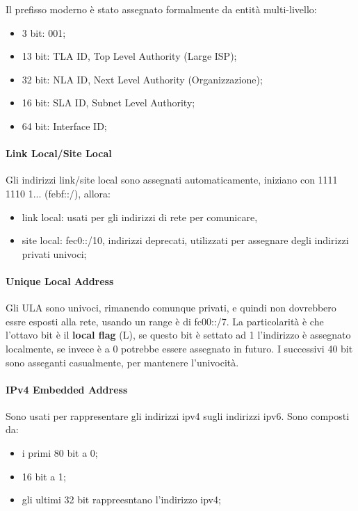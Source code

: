\documentclass[12pt]{article}
\begin{document}
Il prefisso moderno \`e stato assegnato formalmente da entit\`a multi-livello:
\begin{itemize}
    \item 3 bit: 001;
    \item 13 bit: TLA ID, Top Level Authority (Large ISP);
    \item 32 bit: NLA ID, Next Level Authority (Organizzazione);
    \item 16 bit: SLA ID, Subnet Level Authority;
    \item 64 bit: Interface ID;
\end{itemize}


\paragraph{Link Local/Site Local}
Gli indirizzi link/site local sono assegnati automaticamente, iniziano con 1111 1110 1... (febf::/), allora:
\begin{itemize}
    \item link local: usati per gli indirizzi di rete per comunicare,
    \item site local: fec0::/10, indirizzi deprecati, utilizzati per assegnare degli indirizzi privati univoci;
\end{itemize}


\paragraph{Unique Local Address}
Gli ULA sono univoci, rimanendo comunque privati, e quindi non dovrebbero essre esposti alla rete, usando un range \`e di fc00::/7. La particolarit\`a \`e che l'ottavo bit \`e il \textbf{local flag} (L), se questo bit \`e settato ad 1 l'indirizzo \`e assegnato localmente, se invece \`e a 0 potrebbe essere assegnato in futuro. I successivi 40 bit sono asseganti casualmente, per mantenere l'univocit\`a.

\paragraph{IPv4 Embedded Address}
Sono usati per rappresentare gli indirizzi ipv4 sugli indirizzi ipv6. Sono composti da:
\begin{itemize}
    \item i primi 80 bit a 0;
    \item 16 bit a 1;
    \item gli ultimi 32 bit rappreesntano l'indirizzo ipv4;
\end{itemize}
\end{document}

